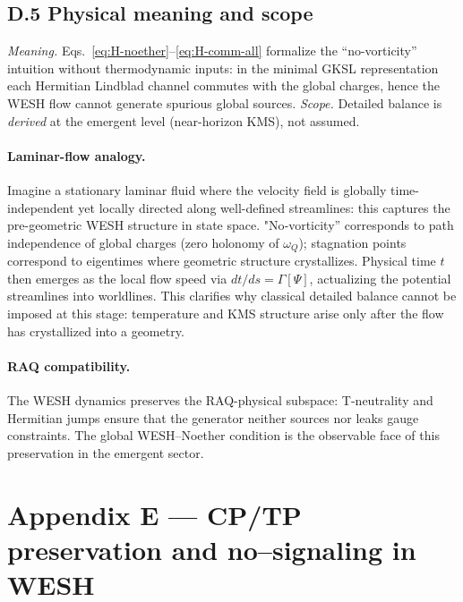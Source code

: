 \documentclass[12pt,a4paper]{article}
\numberwithin{equation}{section}
\begin{document}
\subsection*{D.5 Physical meaning and scope}
\vspace{0.3cm}
\emph{Meaning.} Eqs.~\eqref{eq:H-noether}–\eqref{eq:H-comm-all} formalize the “no-vorticity” intuition without thermodynamic inputs: in the minimal GKSL representation each Hermitian Lindblad channel commutes with the global charges, hence the WESH flow cannot generate spurious global sources.  
\emph{Scope.} Detailed balance is \emph{derived} at the emergent level (near-horizon KMS), not assumed.

\paragraph{Laminar-flow analogy.}
Imagine a stationary laminar fluid where the velocity field is globally time-independent yet locally directed along well-defined streamlines: this captures the pre-geometric WESH structure in state space. "No‑vorticity'' corresponds to path independence of global charges (zero holonomy of $\omega_Q$); stagnation points correspond to eigentimes where geometric structure crystallizes. Physical time $t$ then emerges as the local flow speed via $dt/ds=\Gamma[\Psi]$, actualizing the potential streamlines into worldlines. This clarifies why classical detailed balance cannot be imposed at this stage: temperature and KMS structure arise only after the flow has crystallized into a geometry.



\paragraph{RAQ compatibility.}
The WESH dynamics preserves the RAQ-physical subspace: T-neutrality and Hermitian jumps ensure that the generator neither sources nor leaks gauge constraints. The global WESH--Noether condition is the observable face of this preservation in the emergent sector.
\endgroup

\vspace{1cm}

\section*{Appendix E — CP/TP preservation and no–signaling in WESH}
\label{app:CPTP}
\end{document}
